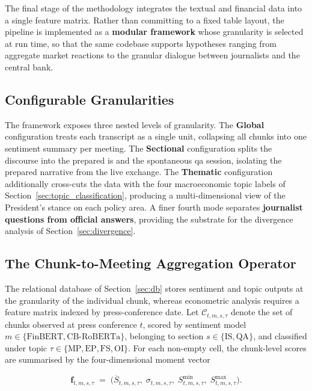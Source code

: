 The final stage of the methodology integrates the textual and financial data into a single feature matrix. Rather than committing to a fixed table layout, the pipeline is implemented as a \textbf{modular framework} whose granularity is selected at run time, so that the same codebase supports hypotheses ranging from aggregate market reactions to the granular dialogue between journalists and the central bank.

\subsection{Configurable Granularities}
\label{sec:granularities}

The framework exposes three nested levels of granularity. The
\textbf{Global} configuration treats each transcript as a single unit, collapsing all chunks into one sentiment summary per meeting. The
\textbf{Sectional} configuration splits the discourse into the prepared
\gls{is} and the spontaneous \gls{qa} session, isolating the prepared narrative from the live exchange. The \textbf{Thematic} configuration additionally cross-cuts the data with the four macroeconomic topic labels of Section~\ref{sec:topic_classification}, producing a multi-dimensional view of the President's stance on each policy area. A finer fourth mode separates \textbf{journalist questions from official answers}, providing the substrate for the divergence analysis of Section~\ref{sec:divergence}.

\subsection{The Chunk-to-Meeting Aggregation Operator}
\label{sec:aggregation}

The relational database of Section~\ref{sec:db} stores sentiment and topic outputs at the granularity of the individual chunk, whereas econometric analysis requires a feature matrix indexed by press-conference date. Let $\mathcal{C}_{t,m,s,\tau}$ denote the set of chunks observed at press conference $t$, scored by sentiment model $m \in \{\text{FinBERT}, \text{CB-RoBERTa}\}$, belonging to section $s \in \{\text{IS}, \text{QA}\}$, and classified under topic $\tau \in \{\text{MP}, \text{EP}, \text{FS}, \text{OI}\}$. For each non-empty cell, the chunk-level scores are summarised by the four-dimensional moment vector

\begin{equation}
    \label{eq:aggregation}
    \mathbf{f}_{t,m,s,\tau}
    \;=\;
    \bigl(\overline{S}_{t,m,s,\tau},\; \sigma_{t,m,s,\tau},\; S^{\min}_{t,m,s,\tau},\; S^{\max}_{t,m,s,\tau}\bigr).
\end{equation}

